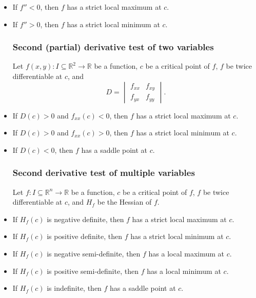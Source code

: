\documentclass[a4paper,12pt]{report}
\begin{document}
\begin{itemize}
\begin{itemize}
\subsubsection{Second derivative test of one variable}
Let $f\colon I\subseteq\mathbb{R}\to\mathbb{R}$ be a function, $c$ be a critical point of $f$, and $f$ be twice differentiable at $c$.
\bit
\item If $f''<0$, then $f$ has a strict local maximum at $c$.
\item If $f''>0$, then $f$ has a strict local minimum at $c$.
\eit
\subsubsection{Second (partial) derivative test of two variables}
Let $f(x,y)\colon I\subseteq\mathbb{R}^2\to\mathbb{R}$ be a function, $c$ be a critical point of $f$, $f$ be twice differentiable at $c$, and
\[D=\begin{vmatrix}
f_{xx} & f_{xy}\\
f_{yx} & f_{yy}
\end{vmatrix}.\]
\bit
\item If $D(c)>0$ and $f_{xx}(c)<0$, then $f$ has a strict local maximum at $c$.
\item If $D(c)>0$ and $f_{xx}(c)>0$, then $f$ has a strict local minimum at $c$.
\item If $D(c)<0$, then $f$ has a saddle point at $c$.
\eit
\subsubsection{Second derivative test of multiple variables}
Let $f\colon I\subseteq\mathbb{R}^n\to\mathbb{R}$ be a function, $c$ be a critical point of $f$, $f$ be twice differentiable at $c$, and $H_f$ be the Hessian of $f$.
\bit
\item If $H_f(c)$ is negative definite, then $f$ has a strict local maximum at $c$.
\item If $H_f(c)$ is positive definite, then $f$ has a strict local minimum at $c$.
\item If $H_f(c)$ is negative semi-definite, then $f$ has a local maximum at $c$.
\item If $H_f(c)$ is positive semi-definite, then $f$ has a local minimum at $c$.
\item If $H_f(c)$ is indefinite, then $f$ has a saddle point at $c$.
\eit

\end{itemize}
\end{itemize}
\end{document}
